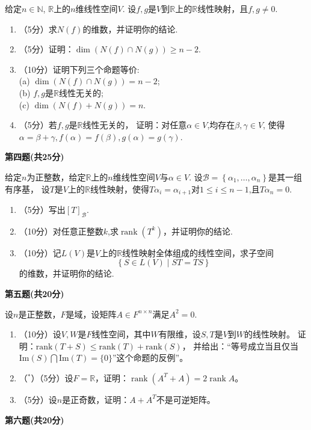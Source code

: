    给定$n\in\mathbb{N}$, $\mathbb{R}$上的$n$维线性空间$V$.
    设$f,g$是$V$到$\mathbb{R}$上的$\mathbb{R}$线性映射，且$f,g\neq 0$.
    \begin{enumerate}
    \item（5分）求$N(f)$的维数，并证明你的结论.
    \item（5分）证明：$\dim(N(f)\cap N(g))\geq n-2$.
    \item（10分）证明下列三个命题等价:\\
        \quad (a) $\dim(N(f)\cap N(g))= n-2$;\\
        \quad (b) $f,g$是$\mathbb{R}$线性无关的;\\
        \quad (c) $\dim(N(f)+ N(g))= n$.\\
    \item（5分）若$f,g$是$\mathbb{R}$线性无关的，
    证明：对任意$\alpha\in V$,均存在$\beta,\gamma\in V$,
    使得$\alpha=\beta+\gamma,f(\alpha)=f(\beta),g(\alpha)=g(\gamma)$.
    \end{enumerate}
    \textbf{第四题(共25分)}
    
    给定$n$为正整数，给定$\mathbb{R}$上的$n$维线性空间$V$与$\alpha\in V$.
    设$\mathcal{B}=\left\{ \alpha_1,\ldots,\alpha_n \right\}$是其一组有序基，
    设$T$是$V$上的$\mathbb{R}$线性映射，使得$T\alpha_i=\alpha_{i+1}$对$1\leq i\leq n-1$,且$T\alpha_n=0$.
    \begin{enumerate}
    \item（5分）写出$[T]_{\mathcal{B}}$.
    \item（10分）对任意正整数$k$,求$\operatorname{rank}(T^k)$，并证明你的结论.
    \item（10分）记$L(V)$是$V$上的$\mathbb{R}$线性映射全体组成的线性空间，求子空间
    $$\left\{ S\in L(V) \mid ST=TS \right\}$$
    的维数，并证明你的结论.
    \end{enumerate}
    \textbf{第五题(共20分)}
    
    设$n$是正整数，$F$是域，设矩阵$A\in F^{n\times n}$满足$A^2=0$.
    \begin{enumerate}
    \item（10分）设$V,W$是$F$线性空间，其中$W$有限维，设$S,T$是$V$到$W$的线性映射。
    证明：$\text{rank}(T+S)\leq\text{rank}(T)+\text{rank}(S)$，
    并给出：``等号成立当且仅当$\text{Im}(S)\bigcap\text{Im}(T)=\{0\}$”这个命题的反例''。
    \item（$^*$）（5分）设$F=\mathbb{R}$，证明：$\operatorname{rank}(A^T+A)=2\operatorname{rank}A$。
    \item（5分）设$n$是正奇数，证明：$A+A^T$不是可逆矩阵。 
    \end{enumerate}
    \textbf{第六题(共20分)}
    
